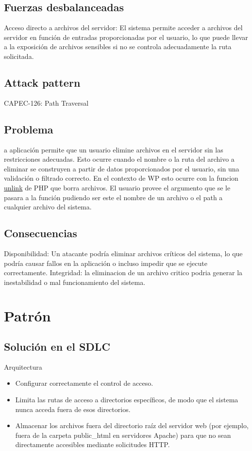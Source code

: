 \subsection*{Fuerzas desbalanceadas}
Acceso directo a archivos del servidor: El sistema permite acceder a archivos del servidor en función de entradas proporcionadas por el usuario, lo que puede llevar a la exposición de archivos sensibles si no se controla adecuadamente la ruta solicitada.

\subsection*{Attack pattern}
CAPEC-126: Path Traversal
\subsection*{Problema}
a aplicación permite que un usuario elimine archivos en el servidor sin las restricciones adecuadas. Esto ocurre cuando el nombre o la ruta del archivo a eliminar se construyen a partir de datos proporcionados por el usuario, sin una validación o filtrado correcto.
En el contexto de WP esto ocurre con la funcion \href{https://www.php.net/unlink}{unlink} de PHP que borra archivos. El usuario provee el argumento que se le pasara a la función pudiendo ser este el nombre de un archivo o el path a cualquier archivo del sistema.
\subsection*{Consecuencias}
Disponibilidad: Un atacante podría eliminar archivos críticos del sistema, lo que podría causar fallos en la aplicación o incluso impedir que se ejecute correctamente.
Integridad: la eliminacion de un archivo critico podria generar la inestabilidad o mal funcionamiento del sistema.
\section{Patrón}
\subsection*{Solución en el SDLC}

Arquitectura
\begin{itemize}
    \item Configurar correctamente el control de acceso.
    \item Limita las rutas de acceso a directorios específicos, de modo que el sistema nunca acceda fuera de esos directorios.
    \item Almacenar los archivos fuera del directorio raíz del servidor web (por ejemplo, fuera de la carpeta public\_html en servidores Apache) para que no sean directamente accesibles mediante solicitudes HTTP.
\end{itemize}

